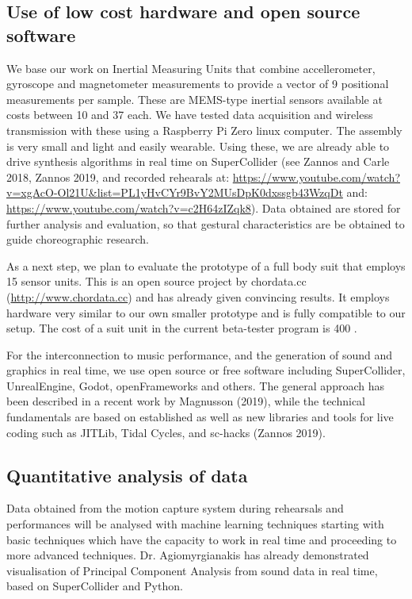 \subsection{Use of low cost hardware and open source software}
\label{sec:org6ed679e}
We base our work on Inertial Measuring Units that combine accellerometer, gyroscope and magnetometer measurements to provide a vector of 9 positional measurements per sample. These are MEMS-type inertial sensors available at costs between 10 and 37 \texteuro{} each.  We have tested data acquisition and wireless transmission with these using a Raspberry Pi Zero linux computer. The assembly is very small and light and easily wearable.  Using these, we are already able to drive synthesis algorithms in real time on SuperCollider (see Zannos and Carle 2018, Zannos 2019, and recorded rehearals at: \url{https://www.youtube.com/watch?v=xgAcO-Ol21U\&list=PL1yHvCYr9BvY2MUsDpK0dxssgb43WzqDt} and: \url{https://www.youtube.com/watch?v=c2H64zIZqk8}).  Data obtained are stored for further analysis and evaluation, so that gestural characteristics are be obtained to guide choreographic research.

As a next step, we plan to evaluate the prototype of a full body suit that employs 15 sensor units.  This is an open source project by chordata.cc (\url{http://www.chordata.cc}) and has already given convincing results.  It employs hardware very similar to our own smaller prototype and is fully compatible to our setup.  The cost of a suit unit in the current beta-tester program is 400 \texteuro{}. 

For the interconnection to music performance, and the generation of sound and graphics in real time, we use open source or free software including SuperCollider, UnrealEngine, Godot, openFrameworks and others.  The general approach has been described in a recent work by Magnusson (2019), while the technical fundamentals are based on established as well as new libraries and tools for live coding such as JITLib, Tidal Cycles, and sc-hacks (Zannos 2019). 

\subsection{Quantitative analysis of data}
\label{sec:orgd82e0d7}
Data obtained from the motion capture system during rehearsals and performances will be analysed with machine learning techniques starting with basic techniques which have the capacity to work in real time and proceeding to more advanced techniques.  Dr. Agiomyrgianakis has already demonstrated visualisation of Principal Component Analysis from sound data in real time, based on SuperCollider and Python. 

